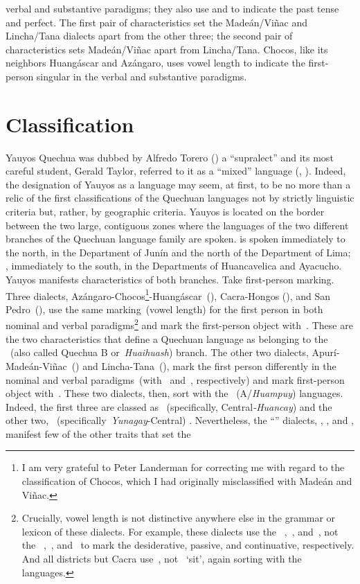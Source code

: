 verbal and substantive paradigms; they also use  and  to indicate the past tense and perfect. The first pair of characteristics set the Madeán/Viñac and Lincha/Tana dialects apart from the other three; the second pair of characteristics sets Madeán/Viñac apart from Lincha/Tana. Chocos, like its neighbors Huangáscar and Azángaro, uses vowel length to indicate the first-person singular in the verbal and substantive paradigms.

\section{Classification}\label{sec:classification}
Yauyos Quechua was dubbed by Alfredo Torero (\citeyear{Torero74}) a “supralect” and its most careful student, Gerald Taylor, referred to it as a “mixed” language (\citealt[2]{Taylor90}, \citealt[105]{Taylor00}). Indeed, the designation of Yauyos as a language may seem, at first, to be no more than a relic of the first classifications of the Quechuan languages not by strictly linguistic criteria but, rather, by geographic criteria. Yauyos is located on the border between the two large, contiguous zones where the languages of the two different branches of the Quechuan language family are spoken. \QI{} is spoken immediately to the north, in the Department of Junín and the north of the Department of Lima; \QII, immediately to the south, in the Departments of Huancavelica and Ayacucho. Yauyos manifests characteristics of both branches. Take first-person marking. Three dialects, Azángaro-Chocos\footnote{I am very grateful to Peter Landerman for correcting me with regard to the classification of Chocos, which I had originally misclassified with Madeán and Viñac.}-Huangáscar~(\ACH), Cacra-Hongos (\CH), and San Pedro~(\SP), use the same marking~(vowel length) for the first person in both nominal and verbal paradigms\footnote{Crucially, vowel length is not distinctive anywhere else in the grammar or lexicon of these dialects. For example, these dialects use the \QII{}~,~, and~, not the \QI{}~,~, and~ to mark the desiderative, passive, and continuative, respectively. And all districts but Cacra use~, not~ ‘sit’, again sorting with the \QII{} languages.} and mark the first-person object with~. These are the two characteristics that define a Quechuan language as belonging to the \QI{}~(also called Quechua B or~\textit{Huaihuash}) branch. The other two dialects, Apurí-Madeán-Viñac~(\AMV) and Lincha-Tana~(\LT), mark the first person differently in the nominal and verbal paradigms~(with~ and~, respectively) and mark first-person object with~. These two dialects, then, sort with the \QII{}~(A/\textit{Huampuy}) languages. Indeed, the first three are classed as \QI{}~(specifically, Central\textit{-Huancay}) and the other two, \QII{}~(specifically~\textit{Yunagay}-Central) \citep[247]{CerroP87}. Nevertheless, the “\QI” dialects, \ACH, \CH, and \SP, manifest few of the other traits that set the 